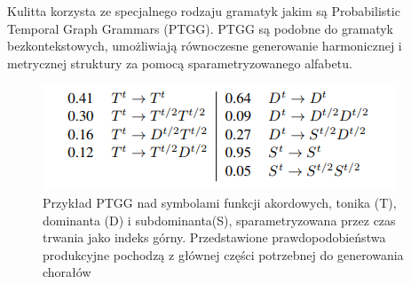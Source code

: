 Kulitta korzysta ze specjalnego rodzaju gramatyk jakim są Probabilistic Temporal Graph Grammars (PTGG). PTGG są podobne do gramatyk bezkontekstowych, umożliwiają równoczesne generowanie harmonicznej i metrycznej struktury za pomocą sparametryzowanego alfabetu.  

\begin{figure}
	\centering
	\includegraphics[width=0.7\linewidth]{ptgg}
	\caption{Przykład PTGG nad symbolami funkcji akordowych, tonika (T),
		dominanta (D) i subdominanta(S), sparametryzowana przez czas trwania jako indeks górny.
		Przedstawione prawdopodobieństwa produkcyjne pochodzą z głównej części potrzebnej do generowania chorałów}
	\label{fig:ptgg}
\end{figure}